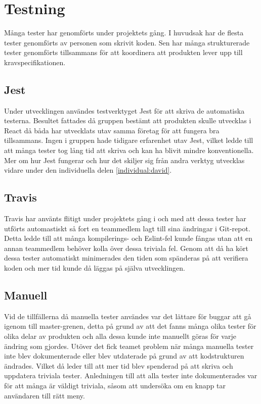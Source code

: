 \section{Testning}
Många tester har genomförts under projektets gång. I huvudsak har de flesta tester genomförts av personen som skrivit koden. Sen har många strukturerade tester genomförts tillsammans för att koordinera att produkten lever upp till kravspecifikationen. 

\subsection{Jest}
Under utvecklingen användes testverktyget Jest för att skriva de automatiska testerna. Besultet fattades då gruppen bestämt att produkten skulle utvecklas i React då båda har utvecklats utav samma företag för att fungera bra tillsammans. Ingen i gruppen hade tidigare erfarenhet utav Jest, vilket ledde till att många tester tog lång tid att skriva och kan ha blivit mindre konventionella. Mer om hur Jest fungerar och hur det skiljer sig från andra verktyg utvecklas vidare under den individuella delen \ref{individual:david}.

\subsection{Travis}
Travis har använts flitigt under projektets gång i och med att dessa tester har utförts automastiskt så fort en teammedlem lagt till sina ändringar i Git-repot. Detta ledde till att många kompilerings- och Eslint-fel kunde fångas utan att en annan teammedlem behöver kolla över dessa triviala fel. Genom att då ha kört dessa tester automatiskt minimerades den tiden som spänderas på att verifiera koden och mer tid kunde då läggas på själva utvecklingen. 

\subsection{Manuell}
Vid de tillfällerna då manuella tester användes var det lättare för buggar att gå igenom till master-grenen, detta på grund av att det fanns många olika tester för olika delar av produkten och alla dessa kunde inte manuellt göras för varje ändring som gjordes. Utöver det fick teamet problem när många manuella tester inte blev dokumenterade eller blev utdaterade på grund av att kodstrukturen ändrades. Vilket då leder till att mer tid blev spenderad på att skriva och uppdatera triviala tester. Anledningen till att alla tester inte dokumenterades var för att många är väldigt triviala, såsom att undersöka om en knapp tar användaren till rätt meny. 
